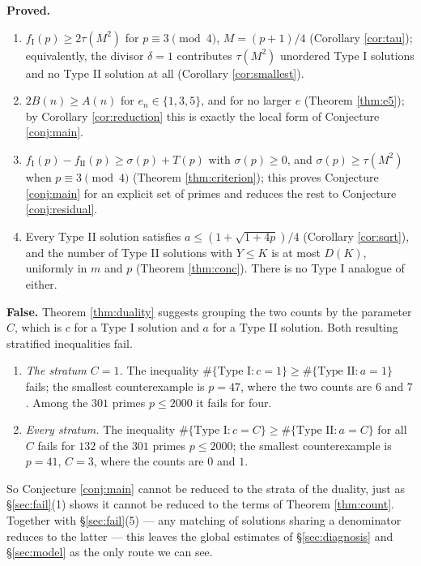 \documentclass[11pt,reqno]{amsart}
\theoremstyle{plain}
\theoremstyle{definition}
\numberwithin{equation}{section}
\newcommand{\fI}{f_{\mathrm{I}}}
\newcommand{\fII}{f_{\mathrm{II}}}
\begin{document}
\smallskip
\noindent\textbf{Proved.}
\begin{enumerate}
\item $\fI(p)\ge2\tau(M^{2})$ for $p\equiv3\pmod4$, $M=(p+1)/4$
(Corollary \ref{cor:tau}); equivalently, the divisor $\delta=1$ contributes
$\tau(M^{2})$ unordered Type I solutions and no Type II solution at all
(Corollary \ref{cor:smallest}).
\item $2B(n)\ge A(n)$ for $e_{n}\in\{1,3,5\}$, and for no larger $e$
(Theorem \ref{thm:e5}); by Corollary \ref{cor:reduction} this is exactly the local
form of Conjecture \ref{conj:main}.
\item $\fI(p)-\fII(p)\ge\sigma(p)+T(p)$ with $\sigma(p)\ge0$, and
$\sigma(p)\ge\tau(M^{2})$ when $p\equiv3\pmod4$ (Theorem \ref{thm:criterion}); this
proves Conjecture \ref{conj:main} for an explicit set of primes and reduces the rest
to Conjecture \ref{conj:residual}.
\item Every Type II solution satisfies $a\le(1+\sqrt{1+4p})/4$ (Corollary
\ref{cor:sqrt}), and the number of Type II solutions with $Y\le K$ is at most $D(K)$,
uniformly in $m$ and $p$ (Theorem \ref{thm:conc}). There is no Type I analogue of
either.
\end{enumerate}

\smallskip
\noindent\textbf{False.}
Theorem \ref{thm:duality} suggests grouping the two counts by the parameter $C$, which
is $c$ for a Type I solution and $a$ for a Type II solution. Both resulting stratified
inequalities fail.
\begin{enumerate}
\item[(5)] \emph{The stratum $C=1$.} The inequality
$\#\{\text{Type I}:c=1\}\ge\#\{\text{Type II}:a=1\}$ fails; the smallest counterexample
is $p=47$, where the two counts are $6$ and $7$. Among the $301$ primes $p\le2000$ it
fails for four.
\item[(6)] \emph{Every stratum.} The inequality
$\#\{\text{Type I}:c=C\}\ge\#\{\text{Type II}:a=C\}$ for all $C$ fails for $132$ of the
$301$ primes $p\le2000$; the smallest counterexample is $p=41$, $C=3$, where the counts
are $0$ and $1$.
\end{enumerate}

\smallskip
\noindent
So Conjecture \ref{conj:main} cannot be reduced to the strata of the duality, just as
\S\ref{sec:fail}(1) shows it cannot be reduced to the terms of Theorem
\ref{thm:count}. Together with \S\ref{sec:fail}(5) --- any matching of solutions
sharing a denominator reduces to the latter --- this leaves the global estimates of
\S\ref{sec:diagnosis} and \S\ref{sec:model} as the only route we can see.
\end{document}
